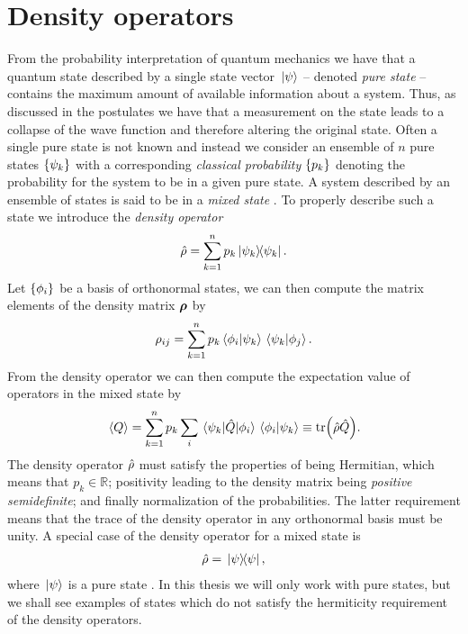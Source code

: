     \section{Density operators}
        \label{sec:density-operators}
        From the probability interpretation of quantum mechanics we have that a
        quantum state described by a single state vector $\ket*{\psi}$ --
        denoted \emph{pure state} -- contains the maximum amount of available
        information about a system.
        Thus, as discussed in the postulates we have that a measurement on the
        state leads to a collapse of the wave function and therefore altering
        the original state.
        Often a single pure state is not known and instead we consider an
        ensemble of $n$ pure states $\left\{ \psi_k \right\}$ with a corresponding
        \emph{classical probability} $\left\{ p_k \right\}$ denoting the probability for
        the system to be in a given pure state.
        A system described by an ensemble of states is said to be in a
        \emph{mixed state} \cite{modern-qm}.
        To properly describe such a state we introduce the \emph{density
        operator}
        \begin{align}
            \density = \sum_{k = 1}^{n} p_k \dyad*{\psi_k}.
        \end{align}
        Let $\left\{ \phi_i \right\}$ be a basis of orthonormal states, we can then
        compute the matrix elements of the density matrix $\boldsymbol{\rho}$ by
        \begin{align}
            \rho_{ij}
            = \sum_{k = 1}^{n}
            p_k \braket*{\phi_i}{\psi_k}\braket*{\psi_k}{\phi_j}.
        \end{align}
        From the density operator we can then compute the expectation value of
        operators in the mixed state by
        \begin{align}
            \expval*{Q}
            = \sum_{k = 1}^{n}
            p_k\sum_{i}
            \mel*{\psi_k}{\hat{Q}}{\phi_i}
            \braket*{\phi_i}{\psi_k}
            \equiv
            \tr(\hat{\rho}\hat{Q}).
        \end{align}
        The density operator $\hat{\rho}$ must satisfy the properties of being
        Hermitian, which means that $p_k \in \mathbb{R}$; positivity leading to
        the density matrix being \emph{positive semidefinite}; and finally
        normalization of the probabilities.
        The latter requirement means that the trace of the density operator in
        any orthonormal basis must be unity.
        A special case of the density operator for a mixed state is
        \begin{align}
            \density = \dyad*{\psi},
        \end{align}
        where $\ket*{\psi}$ is a pure state \cite{modern-qm}.
        In this thesis we will only work with pure states, but we shall see
        examples of states which do not satisfy the hermiticity requirement of
        the density operators.

